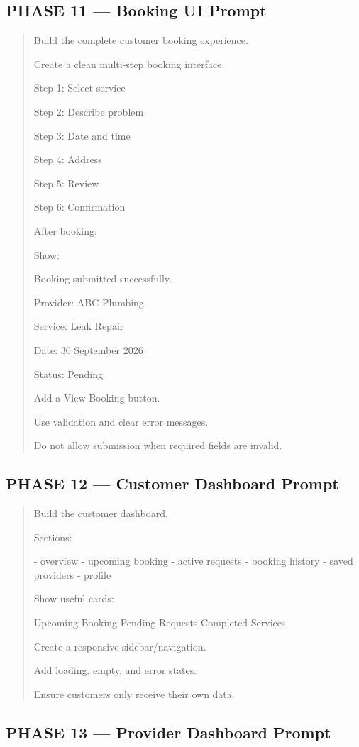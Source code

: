 \subsection*{PHASE 11 --- Booking UI Prompt}

\begin{quote}
Build the complete customer booking experience.

Create a clean multi-step booking interface.

Step 1:
Select service

Step 2:
Describe problem

Step 3:
Date and time

Step 4:
Address

Step 5:
Review

Step 6:
Confirmation

After booking:

Show:

Booking submitted successfully.

Provider:
ABC Plumbing

Service:
Leak Repair

Date:
30 September 2026

Status:
Pending

Add a View Booking button.

Use validation and clear error messages.

Do not allow submission when required fields are invalid.
\end{quote}

\subsection*{PHASE 12 --- Customer Dashboard Prompt}

\begin{quote}
Build the customer dashboard.

Sections:

- overview
- upcoming booking
- active requests
- booking history
- saved providers
- profile

Show useful cards:

Upcoming Booking
Pending Requests
Completed Services

Create a responsive sidebar/navigation.

Add loading, empty, and error states.

Ensure customers only receive their own data.
\end{quote}

\subsection*{PHASE 13 --- Provider Dashboard Prompt}

